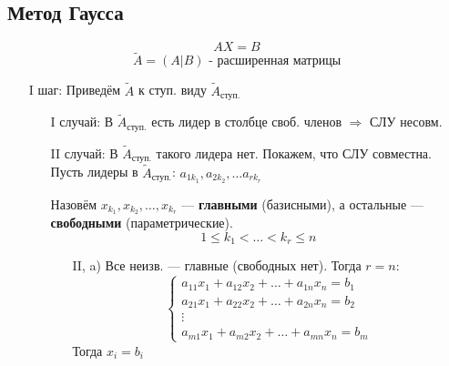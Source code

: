 \subsection{Метод Гаусса}
\[
AX = B
\]
\[
  \widetilde{A} = (A | B) \text{ - расширенная матрицы}
\]
\begin{itemize}
  \item [I шаг:] Приведём $\widetilde{A}$ к ступ. виду $\widetilde{A}_\text{ступ.}$
  \begin{itemize}
    \item [I случай: ] В $\widetilde{A}_\text{ступ.}$ есть лидер в столбце своб. членов $\Rightarrow $ СЛУ несовм.
    \item [II случай: ] В $\widetilde{A}_\text{ступ.}$ такого лидера нет. Покажем, что СЛУ совместна. \\
      Пусть лидеры в $\widetilde{A}_\text{ступ.}$: $a_{1 k_1}, a_{2 k_2}, \ldots a_{r k_r}$
      \begin{definition}
      Назовём $x_{k_1}, x_{k_2}, \ldots, x_{k_r}$ --- \textbf{главными} (базисными), а остальные --- \textbf{свободными} (параметрические).
      \[
      1 \leq k_1 < \ldots < k_r \leq n
      \]
      \end{definition}
      \begin{itemize}
        \item [II, a)] Все неизв. --- главные (свободных нет). Тогда $r = n$:
          \[
            \begin{cases}
            a_{11} x_1 + a_{12} x_2 + \ldots + a_{1n} x_n = b_1 \\
            a_{21} x_1 + a_{22} x_2 + \ldots + a_{2n} x_n = b_2 \\
            \vdots \\
            a_{m 1} x_1 + a_{m 2} x_2 + \ldots + a_{m n} x_n = b_m
            \end{cases}
          \]
          Тогда $x_i = b_i$
      \end{itemize}
  \end{itemize}
\end{itemize}
